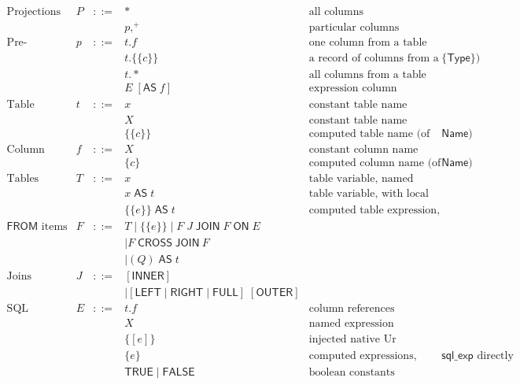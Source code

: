 \documentclass{article}
\newcommand{\mt}[1]{\mathsf{#1}}
\begin{document}
$$\begin{array}{rrcll}
  \textrm{Projections} & P &::=& \ast & \textrm{all columns} \\
  &&& p,^+ & \textrm{particular columns} \\
  \textrm{Pre-projections} & p &::=& t.f & \textrm{one column from a table} \\
  &&& t.\{\{c\}\} & \textrm{a record of columns from a table (of kind $\{\mt{Type}\}$)} \\
  &&& t.* & \textrm{all columns from a table} \\
  &&& E \; [\mt{AS} \; f] & \textrm{expression column} \\
  \textrm{Table names} & t &::=& x & \textrm{constant table name (automatically capitalized)} \\
  &&& X & \textrm{constant table name} \\
  &&& \{\{c\}\} & \textrm{computed table name (of kind $\mt{Name}$)} \\
  \textrm{Column names} & f &::=& X & \textrm{constant column name} \\
  &&& \{c\} & \textrm{computed column name (of kind $\mt{Name}$)} \\
  \textrm{Tables} & T &::=& x & \textrm{table variable, named locally by its own capitalization} \\
  &&& x \; \mt{AS} \; t & \textrm{table variable, with local name} \\
  &&& \{\{e\}\} \; \mt{AS} \; t & \textrm{computed table expression, with local name} \\
  \textrm{$\mt{FROM}$ items} & F &::=& T \mid \{\{e\}\} \mid F \; J \; \mt{JOIN} \; F \; \mt{ON} \; E \\
  &&& \mid F \; \mt{CROSS} \; \mt{JOIN} \ F \\
  &&& \mid (Q) \; \mt{AS} \; t \\
  \textrm{Joins} & J &::=& [\mt{INNER}] \\
  &&& \mid [\mt{LEFT} \mid \mt{RIGHT} \mid \mt{FULL}] \; [\mt{OUTER}] \\
  \textrm{SQL expressions} & E &::=& t.f & \textrm{column references} \\
  &&& X & \textrm{named expression references} \\
  &&& \{[e]\} & \textrm{injected native Ur expressions} \\
  &&& \{e\} & \textrm{computed expressions, probably using $\mt{sql\_exp}$ directly} \\
  &&& \mt{TRUE} \mid \mt{FALSE} & \textrm{boolean constants} \\

\end{array}$$
\end{document}
